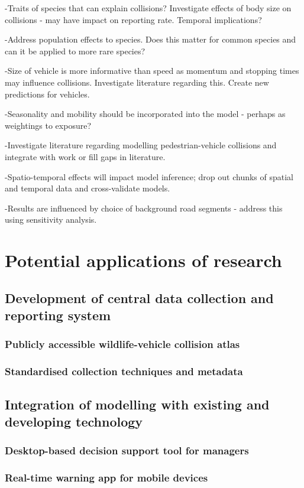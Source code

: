 -Traits of species that can explain collisions? Investigate effects of body size on collisions - may have impact on reporting rate. Temporal implications?

-Address population effects to species.  Does this matter for common species and can it be applied to more rare species?

-Size of vehicle is more informative than speed as momentum and stopping times may influence collisions. Investigate literature regarding this. Create new predictions for vehicles.

-Seasonality and mobility should be incorporated into the model - perhaps as weightings to exposure?

-Investigate literature regarding modelling pedestrian-vehicle collisions and integrate with work or fill gaps in literature.

-Spatio-temporal effects will impact model inference; drop out chunks of spatial and temporal data and cross-validate models.

-Results are influenced by choice of background road segments - address this using sensitivity analysis.

\section{Potential applications of research}

\subsection{Development of central data collection and reporting system}

\subsubsection{Publicly accessible wildlife-vehicle collision atlas}

\subsubsection{Standardised collection techniques and metadata}

\subsection{Integration of modelling with existing and developing technology}

\subsubsection{Desktop-based decision support tool for managers}

\subsubsection{Real-time warning app for mobile devices}
